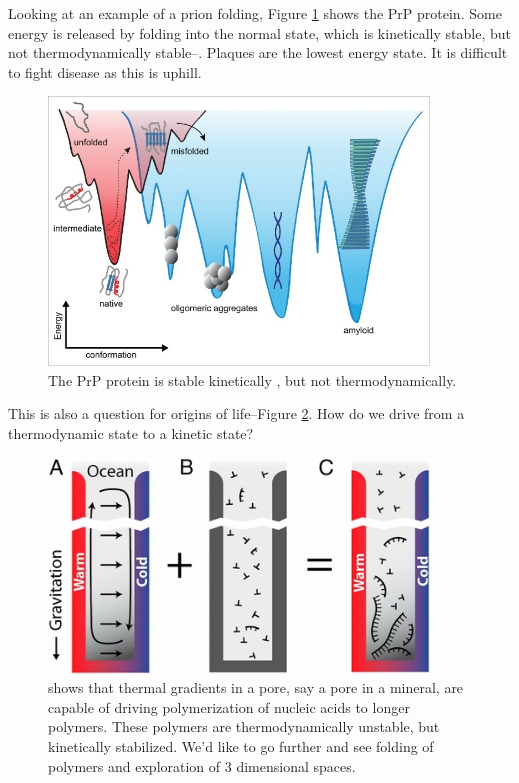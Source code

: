 \documentclass[]{article}
\begin{document}
Looking at an example of a prion folding, Figure \ref{fig:prions} shows the PrP protein. Some energy is released by folding into the normal state, which is kinetically stable, but not thermodynamically stable--\cite{dee2016comparing}. Plaques are the lowest energy state. It is difficult to fight disease as this is uphill.

\begin{figure}[H]
	\caption{The PrP protein is stable kinetically , but not thermodynamically.} \label{fig:prions} 
	\includegraphics[width=0.9\textwidth]{prions}
\end{figure}

This is also a question for origins of life--Figure \ref {fig:EnergyForOrigin}. How do we drive from a thermodynamic state to a kinetic state?
\begin{figure}[H]
	\caption[Thermal gradients in a pore driving polymerization of nucleic acids]{\cite{mast2013escalation} shows that thermal gradients in a pore, say a pore in a mineral, are capable of driving polymerization of nucleic acids to longer polymers. These polymers are thermodynamically unstable, but kinetically stabilized. We'd like to go further and see folding of polymers and exploration of 3 dimensional spaces. } \label{fig:EnergyForOrigin} 
	\includegraphics[width=0.9\textwidth]{EnergyForOrigin}
\end{figure}
\end{document}
